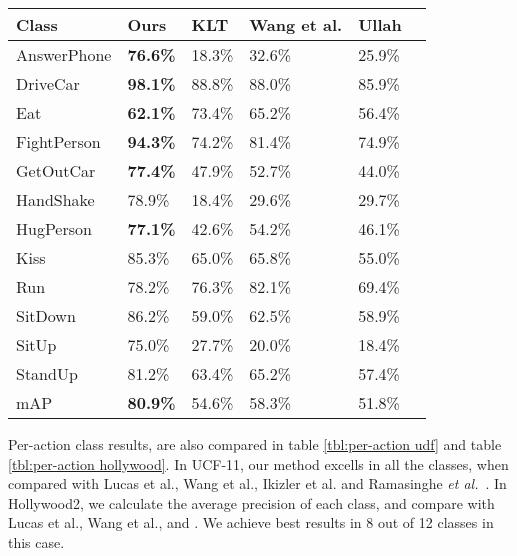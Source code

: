 \begin{table*}[]
\centering
\caption{Per-class mAP comparison with state-of-the-art on Hollywood2.}\label{tbl:per-action hollywood}
\begin{tabular}{|l|l|l|l|l|l|}
\hline
Class            & Ours           & KLT\cite{lucas1981iterative} & Wang et al.\cite{wang2011action} & Ullah\cite{ullah2010improving}   \\ \hline \hline
AnswerPhone      & \textbf{76.6\%}& 18.3\%    & 32.6\%    & 25.9\%        \\
DriveCar         & \textbf{98.1\%}& 88.8\%    & 88.0\%    & 85.9\%     \\
Eat              & \textbf{62.1\%}& 73.4\%    & 65.2\%    & 56.4\%         \\
FightPerson      & \textbf{94.3\%}& 74.2\%    & 81.4\%    & 74.9\%         \\
GetOutCar        & \textbf{77.4\%}& 47.9\%    & 52.7\%    & 44.0\%       \\
HandShake        & 78.9\%         & 18.4\%    & 29.6\%    & 29.7\%         \\
HugPerson        & \textbf{77.1\%}& 42.6\%    & 54.2\%    & 46.1\%         \\
Kiss             & 85.3\%         & 65.0\%    & 65.8\%    & 55.0\%         \\
Run              & 78.2\%         & 76.3\%    & 82.1\%    & 69.4\%         \\
SitDown          & 86.2\%         & 59.0\%    & 62.5\%    & 58.9\%         \\
SitUp            & 75.0\%         & 27.7\%    & 20.0\%    & 18.4\%         \\
StandUp          & 81.2\%         & 63.4\%    & 65.2\%    & 57.4\%         \\ \hline
mAP              &     \textbf{80.9\%}           &   54.6\%         &     58.3\%       &     51.8\%      \\ \hline
\end{tabular}
\end{table*}




Per-action class results, are also compared in table \ref{tbl:per-action udf} and table \ref{tbl:per-action hollywood}. In UCF-11, our method excells
in all the classes, when compared with Lucas et al.\cite{lucas1981iterative}, Wang et al.\cite{wang2011action}, Ikizler et al.\cite{ikizler2010object}
and Ramasinghe \emph{et al.}~\cite{7486474}. In Hollywood2,
we calculate the average precision of each class, and compare with Lucas et al.\cite{lucas1981iterative}, Wang et al.\cite{wang2011action}, and \cite{}.
We achieve best results in 8 out of 12 classes in this case.






